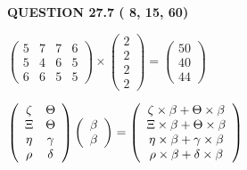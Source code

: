 \documentclass[12pt]{article}
\begin{document}
   
  
\vspace{0.2in}
  
{\textbf{\Large{QUESTION
27.7 
 (          8,         15,         60)
}}}
  
  
 
 
\noindent{}

 
$\left( \begin{array}{ccccccccccccccc}
           5 & 
           7 & 
           7 & 
           6 \\ 
           5 & 
           4 & 
           6 & 
           5 \\ 
           6 & 
           6 & 
           5 & 
           5
\end{array}\right) \times
\left( \begin{array}{c}
           2 \\ 
           2 \\ 
           2 \\ 
           2
\end{array}\right)  =
\left( \begin{array}{c}
          50 \\ 
          40 \\ 
          44
\end{array}\right)  $
 
$  %
 \left( \begin{array}
 {
 c
 c
 }
                    \zeta & 
 \Theta \\ 
                    \Xi & 
 \Theta \\ 
 \eta & 
 \gamma \\ 
 \rho & 
 \delta
 \end{array} \right)
 \left( \begin{array}
 {
 c
 }
 \beta \\ 
 \beta
 \end{array} \right)
=
  \left( \begin{array}
 {
 c
 }
                    \zeta \times  \beta   +  \Theta \times  \beta \\ 
                    \Xi \times  \beta   +  \Theta \times  \beta \\ 
 \eta \times  \beta   +  \gamma \times  \beta \\ 
 \rho \times  \beta   +  \delta \times  \beta
 \end{array} \right)
$
 
 
 
\end{document}
